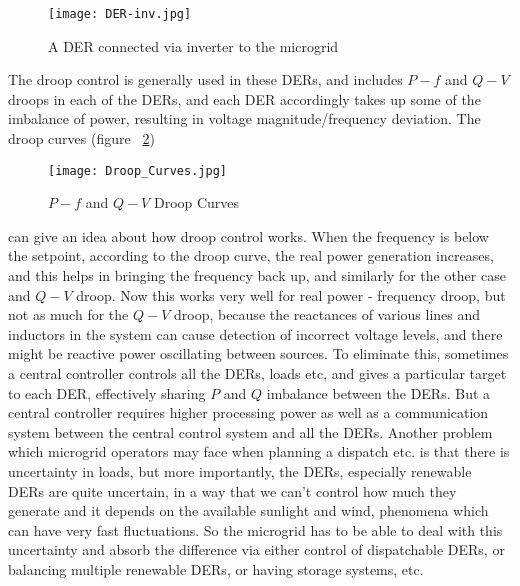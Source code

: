 \begin{figure}[tbp]
  \centering
    \texttt{[image: DER-inv.jpg]}%
    \caption[DERs]{A DER connected via inverter to the microgrid}
    \label{fig:certs31} 
\end{figure}
The droop control is generally used in these DERs, and 
includes $P-f$ and $Q-V$ droops in each of the DERs, and each DER accordingly takes up some of the imbalance of power, resulting in voltage magnitude/frequency deviation. The droop curves (figure ~\ref{fig:00993176})
\begin{figure}[tbp]
  \centering
    \texttt{[image: Droop\_Curves.jpg]}%
    \caption[Droop Curves]{$P-f$ and $Q-V$ Droop Curves}
    \label{fig:00993176} 
\end{figure}
can give an idea about how droop control works. When the frequency is below the setpoint, according to the droop curve, the real power generation increases, and this helps in bringing the frequency back up, and similarly for the other case and $Q-V$ droop. Now this works very well for real power - frequency droop, but not as much for the $Q-V$ droop, because the reactances of various lines and inductors in the system can cause detection of incorrect voltage levels, and there might be reactive power oscillating between sources. To eliminate this, sometimes a central controller controls all the DERs, loads etc, and gives a particular target to each DER, effectively sharing $P$ and $Q$ imbalance between the DERs. But a central controller requires higher processing power as well as a communication system between the central control system and all the DERs.
Another problem which microgrid operators may face when planning a dispatch etc. is that there is uncertainty in loads, but more importantly, the DERs, especially renewable DERs are quite uncertain, in a way that we can't control how much they generate and it depends on the available sunlight and wind, phenomena which can have very fast fluctuations. So the microgrid has to be able to deal with this uncertainty and absorb the difference via either control of dispatchable DERs, or balancing multiple renewable DERs, or having storage systems, etc.\\

